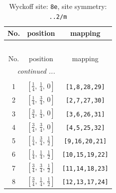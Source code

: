 \documentclass[fleqn,8pt]{jsarticle}
\begin{document}
\begin{longtable}{ccc}
\caption{Wyckoff site: {\tt 8e}, site symmetry: {\tt ..2/m}}
 \\
 \hline \hline
No. & position & mapping \\ \hline \endfirsthead

\multicolumn{2}{l}{\tablename\ \thetable{}} \\
 \hline \hline
No. & position & mapping \\ \hline \endhead

 \hline \hline
\multicolumn{2}{r}{\footnotesize\it continued ...} \\ \endfoot

 \hline \hline
\multicolumn{2}{r}{} \\ \endlastfoot

1 & $\left[ \frac{1}{4},\, \frac{1}{4},\, 0 \right]$ & {\tt [1,8,28,29]} \\ \hline
2 & $\left[ \frac{1}{4},\, \frac{3}{4},\, 0 \right]$ & {\tt [2,7,27,30]} \\ \hline
3 & $\left[ \frac{3}{4},\, \frac{1}{4},\, 0 \right]$ & {\tt [3,6,26,31]} \\ \hline
4 & $\left[ \frac{3}{4},\, \frac{3}{4},\, 0 \right]$ & {\tt [4,5,25,32]} \\ \hline
5 & $\left[ \frac{1}{4},\, \frac{3}{4},\, \frac{1}{2} \right]$ & {\tt [9,16,20,21]} \\ \hline
6 & $\left[ \frac{1}{4},\, \frac{1}{4},\, \frac{1}{2} \right]$ & {\tt [10,15,19,22]} \\ \hline
7 & $\left[ \frac{3}{4},\, \frac{3}{4},\, \frac{1}{2} \right]$ & {\tt [11,14,18,23]} \\ \hline
8 & $\left[ \frac{3}{4},\, \frac{1}{4},\, \frac{1}{2} \right]$ & {\tt [12,13,17,24]} \\
\end{longtable}
\renewcommand{\arraystretch}{1.2}
\end{document}
